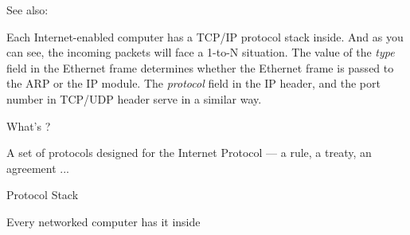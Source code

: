 See also: 

Each Internet-enabled computer has a TCP/IP protocol stack inside. And as you can see, the
incoming packets will face a 1-to-N situation. The value of the \emph{type} field in the
Ethernet frame determines whether the Ethernet frame is passed to the ARP or the IP
module. The \emph{protocol} field in the IP header, and the port number in TCP/UDP header
serve in a similar way.

\begin{frame}{What's {\tcpip{}}?}
  \begin{block}{A set of protocols designed for the Internet}
    Protocol --- a rule, a treaty, an agreement ...
  \end{block}
  \begin{center}
  \end{center}
\end{frame}

\begin{frame}{{\tcpip{}} Protocol Stack}
  \begin{block}{Every networked computer has it inside}
    \begin{center}
    \end{center}
  \end{block}
\end{frame}

